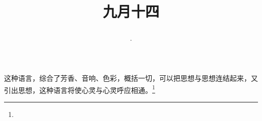 \title{\date[d=16,m=10,y=2024][year:cn-y,年,month:cn,day:cn,日,·,weekday]·九月十四 }
这种语言，综合了芳香、音响、色彩，概括一切，可以把思想与思想连结起来，又引出思想，这种语言将使心灵与心灵呼应相通。\footnote{ }

